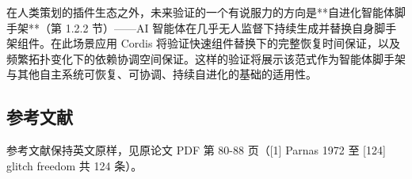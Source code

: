 \documentclass[11pt,a4paper]{article}
\theoremstyle{plain}
\theoremstyle{definition}
\theoremstyle{remark}
\begin{document}
在人类策划的插件生态之外，未来验证的一个有说服力的方向是**自进化智能体脚手架**（第 1.2.2 节）——AI 智能体在几乎无人监督下持续生成并替换自身脚手架组件。在此场景应用 Cordis 将验证快速组件替换下的完整恢复时间保证，以及频繁拓扑变化下的依赖协调空间保证。这样的验证将展示该范式作为智能体脚手架与其他自主系统可恢复、可协调、持续自进化的基础的适用性。

\subsection*{参考文献}

参考文献保持英文原样，见原论文 PDF 第 80-88 页（[1] Parnas 1972 至 [124] glitch freedom 共 124 条）。
\end{document}

